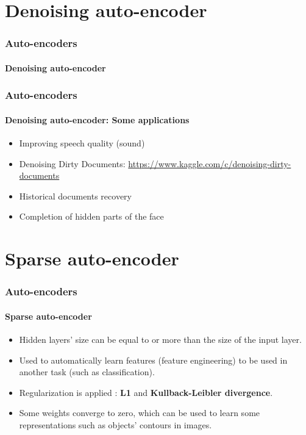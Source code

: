\documentclass[xcolor=table]{beamer}
\begin{document}
\section{Denoising auto-encoder}

\begin{frame}
\frametitle{Auto-encoders}
\framesubtitle{Denoising auto-encoder}


\end{frame}

\begin{frame}
\frametitle{Auto-encoders}
\framesubtitle{Denoising auto-encoder: Some applications}

\begin{itemize}
	\item Improving speech quality (sound) \cite{2013-lu}
	\item Denoising Dirty Documents: \url{https://www.kaggle.com/c/denoising-dirty-documents}
	\item Historical documents recovery \cite{2019-neji}
	\item Completion of hidden parts of the face \cite{2017-li-al}
\end{itemize}

\end{frame}

\section{Sparse auto-encoder}

\begin{frame}
\frametitle{Auto-encoders}
\framesubtitle{Sparse auto-encoder}

\begin{itemize}
	\item Hidden layers' size can be equal to or more than the size of the input layer.
	\item Used to automatically learn features (feature engineering) to be used in another task (such as classification).
	\item Regularization is applied : \textbf{L1} and \textbf{Kullback-Leibler divergence}.
	\item Some weights converge to zero, which can be used to learn some representations such as objects' contours in images.
\end{itemize}

\end{frame}
\end{document}
